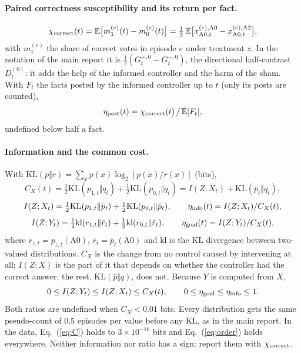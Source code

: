 \documentclass[10pt,a4paper]{article}
\begin{document}
\paragraph{Paired correctness susceptibility and its return per fact.}
\begin{equation}\label{eq:chi}
\chi_{\rm correct}(t) = \mathbb E\bigl[m^{(e)}_{1}(t) - m^{(e)}_{0}(t)\bigr]
= \tfrac12\,\mathbb E\bigl[x^{(e),\rm A0}_{\text{A0},t} - x^{(e),\rm A2}_{\text{A0},t}\bigr],
\end{equation}
with $m^{(e)}_z$ the share of correct votes in episode $e$ under treatment $z$. In the notation of the main report it is
$\frac12(G^{+,0}_t - G^{-,0}_t)$, the directional half-contrast $D^{(0)}_t$: it adds the help of the informed
controller and the harm of the sham. With $F_t$ the facts posted by the informed controller up to $t$ (only its posts
are counted),
\begin{equation}\label{eq:post}
\eta_{\rm post}(t) = \chi_{\rm correct}(t)\,/\,\mathbb E[F_t],
\end{equation}
undefined below half a fact.

\paragraph{Information and the common cost.} With $\mathrm{KL}(p\Vert r) = \sum_x p(x)\log_2[p(x)/r(x)]$ (bits),
\begin{equation}\label{eq:C}
C_X(t) = \tfrac12\mathrm{KL}(p_{1,t}\Vert q_t) + \tfrac12\mathrm{KL}(p_{0,t}\Vert q_t)
= I(Z;X_t) + \mathrm{KL}(\bar p_t\Vert q_t),
\end{equation}
\begin{equation}\label{eq:info}
I(Z;X_t) = \tfrac12\mathrm{KL}(p_{1,t}\Vert\bar p_t) + \tfrac12\mathrm{KL}(p_{0,t}\Vert\bar p_t),\qquad
\eta_{\rm info}(t) = I(Z;X_t)/C_X(t),
\end{equation}
\begin{equation}\label{eq:goal}
I(Z;Y_t) = \tfrac12\mathrm{kl}(r_{1,t}\Vert\bar r_t) + \tfrac12\mathrm{kl}(r_{0,t}\Vert\bar r_t),\qquad
\eta_{\rm goal}(t) = I(Z;Y_t)/C_X(t),
\end{equation}
where $r_{z,t} = p_{z,t}(\text{A0})$, $\bar r_t = \bar p_t(\text{A0})$ and kl is the KL divergence between two-valued
distributions. $C_X$ is the change from no control caused by intervening at all; $I(Z;X)$ is the part of it that
depends on whether the controller had the correct answer; the rest, $\mathrm{KL}(\bar p\Vert q)$, does not. Because
$Y$ is computed from $X$,
\begin{equation}\label{eq:order}
0 \le I(Z;Y_t) \le I(Z;X_t) \le C_X(t), \qquad 0 \le \eta_{\rm goal} \le \eta_{\rm info} \le 1 .
\end{equation}
Both ratios are undefined when $C_X < 0.01$ bits. Every distribution gets the same pseudo-count of 0.5 episodes per
value before any KL, as in the main report. In the data, Eq.~(\ref{eq:C}) holds to $3\times10^{-16}$ bits and
Eq.~(\ref{eq:order}) holds everywhere. Neither information nor ratio has a sign: report them with $\chi_{\rm correct}$.
\end{document}
